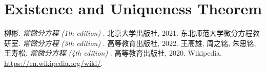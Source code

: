 \documentclass[11pt]{../../TexTemplate/elegantbook}
\begin{document}
\chapter{Existence and Uniqueness Theorem}




\begin{thebibliography}{99} 
 柳彬. \emph{常微分方程 (1th edition) }. 北京大学出版社, 2021.
 东北师范大学微分方程教研室. \emph{常微分方程 (3th edition) }. 高等教育出版社, 2022.
 王高雄, 周之铭, 朱思铭, 王寿松. \emph{常微分方程 (4th edition) }. 高等教育出版社, 2020.
 Wikipedia. \url{https://en.wikipedia.org/wiki/}.

\end{thebibliography}
\end{document}
